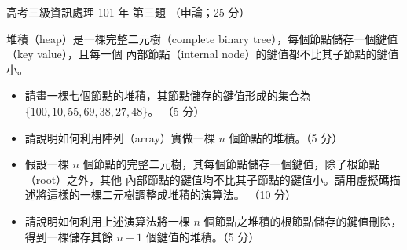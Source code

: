 \begin{pastexam}[label={px:gk3-101-ds-03}]{高考三級資訊處理 101 年 第三題}
（申論；25 分）

堆積（heap）是一棵完整二元樹（complete binary tree），每個節點儲存一個鍵值（key value），且每一個
內部節點（internal node）的鍵值都不比其子節點的鍵值小。
\begin{itemize}[leftmargin=2em, labelsep=0.3em, itemsep=2pt]
\item[㈠] 請畫一棵七個節點的堆積，其節點儲存的鍵值形成的集合為 $\{100, 10, 55, 69, 38, 27, 48\}$。
（5 分）
\item[㈡] 請說明如何利用陣列（array）實做一棵 $n$ 個節點的堆積。（5 分）
\item[㈢] 假設一棵 $n$ 個節點的完整二元樹，其每個節點儲存一個鍵值，除了根節點（root）之外，其他
內部節點的鍵值均不比其子節點的鍵值小。請用虛擬碼描述將這樣的一棵二元樹調整成堆積的演算法。
（10 分）
\item[㈣] 請說明如何利用上述演算法將一棵 $n$ 個節點之堆積的根節點儲存的鍵值刪除，得到一棵儲存其餘
$n-1$ 個鍵值的堆積。（5 分）
\end{itemize}
\end{pastexam}

